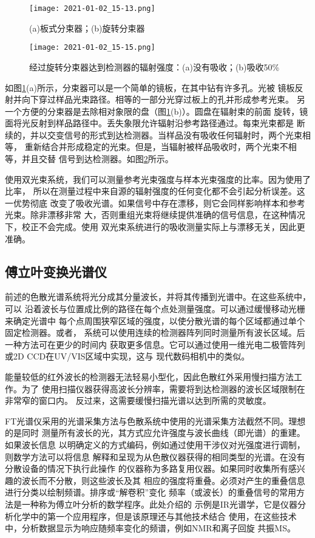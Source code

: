 \begin{figure}[htpb]
    \centering
    \texttt{[image: 2021-01-02\_15-13.png]}
    \caption{(a)板式分束器；(b)旋转分束器}
    \label{fig:2.32}
\end{figure}
\begin{figure}[htpb]
    \centering
    \texttt{[image: 2021-01-02\_15-15.png]}
    \caption{经过旋转分束器达到检测器的辐射强度：(a)没有吸收；(b)吸收50\%}
    \label{fig:2.33}
\end{figure}

如图\ref{fig:2.32}(a)所示，分束器可以是一个简单的镜板，在其中钻有许多孔。光被
镜板反射并向下穿过样品光束路径。相等的一部分光穿过板上的孔并形成参考光束。
另一个方便的分束器是去除相对象限的盘（图\ref{fig:2.32}(b)）。圆盘在辐射束的前面
旋转，镜面将光反射到样品路径中。丢失象限允许辐射沿参考路径通过。每束光束都是
断续的，并以交变信号的形式到达检测器。当样品没有吸收任何辐射时，两个光束相等，
重新结合并形成稳定的光束。但是，当辐射被样品吸收时，两个光束不相等，并且交替
信号到达检测器。如图\ref{fig:2.33}所示。

使用双光束系统，我们可以测量参考光束强度与样本光束强度的比率。因为使用了比率，
所以在测量过程中来自源的辐射强度的任何变化都不会引起分析误差。这一优势彻底
改变了吸收光谱。如果信号中存在漂移，则它会同样影响样本和参考光束。除非漂移非常
大，否则重组光束将继续提供准确的信号信息，在这种情况下，校正不会完成。使用
双光束系统进行的吸收测量实际上与漂移无关，因此更准确。
\subsection{傅立叶变换光谱仪}
前述的色散光谱系统将光分成其分量波长，并将其传播到光谱中。在这些系统中，可以
沿着波长与位置成比例的路径在每个点处测量强度。可以通过缓慢移动光栅来确定光谱中
每个点周围狭窄区域的强度，以使分散光谱的每个区域都通过单个固定检测器。或者，
系统可以使用连续的检测器阵列同时测量所有波长区域。后一种方法可在更少的时间内
获取更多信息。它可以通过使用一维光电二极管阵列或2D CCD在UV/VIS区域中实现，这与
现代数码相机中的类似。

能量较低的红外波长的检测器无法轻易小型化，因此色散红外采用慢扫描方法工作。为了
使用扫描仪器获得高波长分辨率，需要将到达检测器的波长区域限制在非常窄的窗口内。
反过来，这需要缓慢扫描光谱以达到所需的灵敏度。

FT光谱仪采用的光谱采集方法与色散系统中使用的光谱采集方法截然不同。理想的是同时
测量所有波长的光，其方式应允许强度与波长曲线（即光谱）的重建。如果波长信息
以明确定义的方式编码，例如通过使用干涉仪对光强度进行调制，则数学方法可以将信息
解释和呈现为从色散仪器获得的相同类型的光谱。在没有分散设备的情况下执行此操作
的仪器称为多路复用仪器。如果同时收集所有感兴趣的波长而不分散，则这些波长及其
相应的强度将重叠。必须对产生的重叠信息进行分类以绘制频谱。排序或“解卷积”变化
频率（或波长）的重叠信号的常用方法是一种称为傅立叶分析的数学程序。此处介绍的
示例是IR光谱学，它是仪器分析化学中的第一个应用程序，但是该原理还与其他技术结合
使用，在这些技术中，分析数据显示为响应随频率变化的频谱，例如NMR和离子回旋
共振MS。

